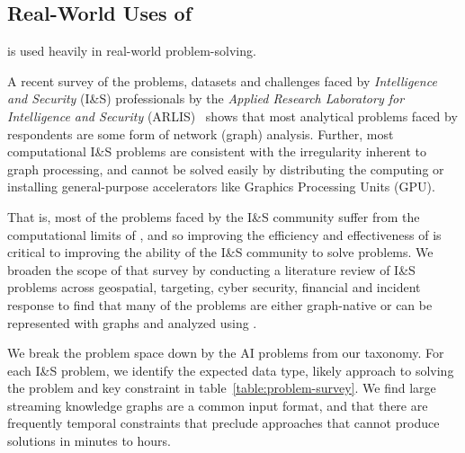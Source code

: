 \subsection{Real-World Uses of \gai}

\gai is used heavily in real-world problem-solving. 

A recent survey of the problems, datasets and challenges faced by \textit{Intelligence and Security} (I\&S) professionals by the \textit{Applied Research Laboratory for Intelligence and Security} (ARLIS)~\cite{Regli2022a} shows that most analytical problems faced by respondents are some form of network (graph) analysis.
Further, most computational I\&S problems are consistent with the irregularity inherent to graph processing, and cannot be solved easily by distributing the computing or installing general-purpose accelerators like Graphics Processing Units (GPU).

That is, most of the problems faced by the I\&S community suffer from the computational limits of \gai, and so improving the efficiency and effectiveness of \gai is critical to improving the ability of the I\&S community to solve problems. 
We broaden the scope of that survey by conducting a literature review of I\&S problems across geospatial, targeting, cyber security, financial and incident response to find that many of the problems are either graph-native or can be represented with graphs and analyzed using \gai. 

We break the problem space down by the AI problems from our taxonomy.
For each I\&S problem, we identify the expected data type, likely \gai approach to solving the problem and key constraint in table~\ref{table:problem-survey}. 
We find large streaming knowledge graphs are a common input format, and that there are frequently temporal constraints that preclude \gai approaches that cannot produce solutions in minutes to hours. 

 


